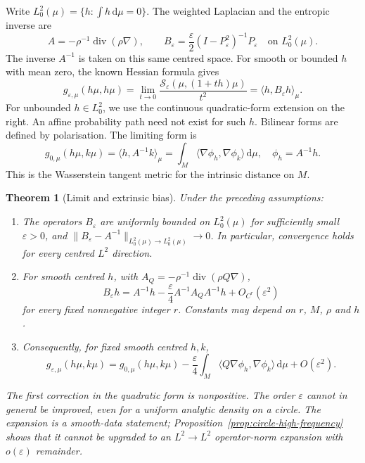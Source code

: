 \documentclass[11pt,a4paper]{article}
\newtheorem{theorem}{Theorem}[section]
\theoremstyle{definition}\newtheorem{definition}[theorem]{Definition}
\theoremstyle{remark}\newtheorem{remark}[theorem]{Remark}
\newcommand{\eps}{\varepsilon}
\newcommand{\dd}{\,\mathrm d}
\newcommand{\diver}{\operatorname{div}}
\newcommand{\ip}[2]{\langle #1,#2\rangle_\mu}
\newcommand{\norm}[1]{\lVert #1\rVert}
\newcommand{\SD}{\mathcal S}
\begin{document}
Write $L^2_0(\mu)=\{h:\int h\dd\mu=0\}$. The weighted Laplacian and the entropic inverse are
\begin{equation}\label{eq:operators}
A=-\rho^{-1}\diver(\rho\nabla),\qquad
B_\eps=\frac{\eps}{2}(I-P_\eps^2)^{-1}P_\eps
\quad\text{on }L^2_0(\mu).
\end{equation}
The inverse $A^{-1}$ is taken on this same centred space. For smooth or bounded $h$ with mean zero, the known Hessian formula \cite[Theorem 3.4 and Section 4]{LLMST} gives
\begin{equation}\label{eq:metric}
g_{\eps,\mu}(h\mu,h\mu)
=\lim_{t\to0}\frac{\SD_\eps(\mu,(1+th)\mu)}{t^2}
=\ip{h}{B_\eps h}.
\end{equation}
For unbounded $h\in L^2_0$, we use the continuous quadratic-form extension on the right. An affine probability path need not exist for such $h$. Bilinear forms are defined by polarisation. The limiting form is
\begin{equation}\label{eq:g0}
g_{0,\mu}(h\mu,k\mu)=\ip{h}{A^{-1}k}
=\int_M\langle\nabla\phi_h,\nabla\phi_k\rangle\dd\mu,
\quad \phi_h=A^{-1}h.
\end{equation}
This is the Wasserstein tangent metric for the intrinsic distance on $M$.

\begin{theorem}[Limit and extrinsic bias]\label{thm:main}
Under the preceding assumptions:
\begin{enumerate}[label=(\roman*),leftmargin=2em]
\item The operators $B_\eps$ are uniformly bounded on $L^2_0(\mu)$ for sufficiently small $\eps>0$, and $\norm{B_\eps-A^{-1}}_{L^2_0(\mu)\to L^2_0(\mu)}\to0$. In particular, convergence holds for every centred $L^2$ direction.
\item For smooth centred $h$, with $A_Q=-\rho^{-1}\diver(\rho Q\nabla)$,
\begin{equation}\label{eq:Bexp}
B_\eps h=A^{-1}h-\frac{\eps}{4}A^{-1}A_QA^{-1}h+O_{C^r}(\eps^2)
\end{equation}
for every fixed nonnegative integer $r$. Constants may depend on $r$, $M$, $\rho$ and $h$.
\item Consequently, for fixed smooth centred $h,k$,
\begin{equation}\label{eq:bias}
g_{\eps,\mu}(h\mu,k\mu)=g_{0,\mu}(h\mu,k\mu)
-\frac{\eps}{4}\int_M\langle Q\nabla\phi_h,\nabla\phi_k\rangle\dd\mu
+O(\eps^2).
\end{equation}
\end{enumerate}
The first correction in the quadratic form is nonpositive. The order $\eps$ cannot in general be improved, even for a uniform analytic density on a circle. The expansion is a smooth-data statement; Proposition~\ref{prop:circle-high-frequency} shows that it cannot be upgraded to an $L^2\!\to L^2$ operator-norm expansion with $o(\eps)$ remainder.
\end{theorem}
\end{document}
